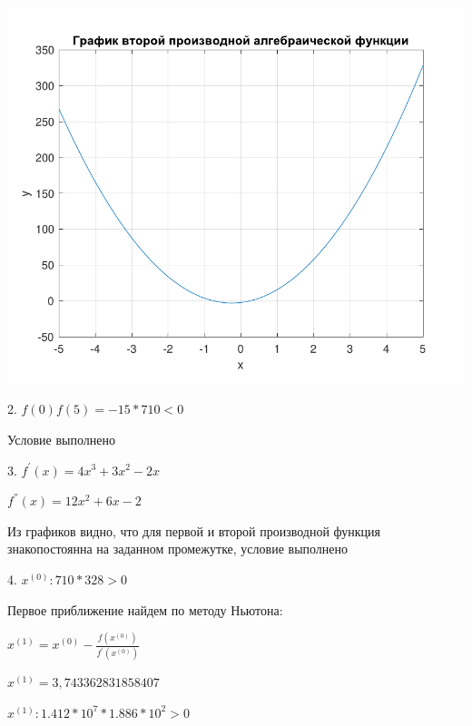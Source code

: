 \includegraphics[scale=0.75]{10.pdf}

2.  \begin{math}
	f(0)f(5)=-15*710<0 
\end{math}

Условие выполнено

3. \begin{math}
	f^{'}(x)=4x^{3}+3x^{2}-2x
	\end{math}

\begin{math}
	f^{''}(x)=12x^{2}+6x-2
\end{math}

Из графиков видно, что для первой и второй производной функция знакопостоянна на заданном промежутке, условие выполнено

4. \begin{math}
		x^{(0)}:710*328>0
\end{math}

Первое приближение найдем по методу Ньютона: 

\begin{math}
	x^{(1)}=x^{(0)}-\frac{f(x^{(0)})}{f^{'}(x^{(0)})}
\end{math}

\begin{math}
	x^{(1)}=3,743362831858407
\end{math}


\begin{math}
	   x^{(1)}:1.412*10^{7}*1.886*10^{2}>0
\end{math}

